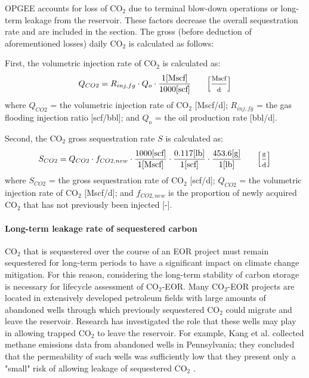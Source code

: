 \documentclass[11pt]{report}
\newcommand{\marg}[1]{{\footnotesize\textit{\textcolor{stanford}{'#1'}}}}
\newcommand{\marginnote}[1]{\marginpar{\marg{#1}}}
\begin{document}
{OPGEE accounts for loss of CO$_2$ due to terminal blow-down operations or long-term leakage from the reservoir. These factors decrease the overall sequestration rate and are included in the  section. The gross (before deduction of aforementioned losses) daily CO$_2$ is calculated as follows:

First, the volumetric injection rate of CO$_2$ is calculated as: 
\begin{equation} \label{eq:VolumetricFloodGasInjectionRate}
Q_{CO2} = R_{inj,fg} \cdot Q_{o} \cdot \frac{1 [\text{Mscf}]}{1000 [\text{scf}]} \begin{footnotesize} \quad\quad \left[\frac{\text{Mscf}}{\text{d}}\right] \end{footnotesize}
\end{equation}
where $Q_{CO2}$ = the volumetric injection rate of CO$_2$ [Mscf/d]; $R_{inj,fg}$ = the gas flooding injection ratio [scf/bbl]; and $Q_{o}$ = the oil production rate [bbl/d].

Second, the CO$_2$ gross sequestration rate $S$ is calculated as: \marginnote{Production \& Extraction 2.7.11} 
\begin{equation} \label{eq:CO2Sequestration}
S_{CO2} = Q_{CO2} \cdot f_{CO2,new} \cdot \frac{1000 [\text{scf}]}{1 [\text{Mscf}]} \cdot \frac{0.117 [\text{lb}]}{1 [\text{scf}]} \cdot \frac{453.6 [\text{g}]}{1 [\text{lb}]} \begin{footnotesize} \quad\quad \left[\frac{\text{g}}{\text{d}}\right] \end{footnotesize}
\end{equation}
where $S_{CO2}$ = the gross sequestration rate of CO$_2$ [scf/d]; $Q_{CO2}$ = the volumetric injection rate of CO$_2$ [Mscf/d]; and $f_{CO2,new}$ is the proportion of newly acquired CO$_2$ that has not previously been injected [-].


\paragraph{Long-term leakage rate of sequestered carbon} \label{par:LongTermLeakageRate}
CO$_2$ that is sequestered over the course of an EOR project must remain sequestered for long-term periods to have a significant impact on climate change mitigation. For this reason, considering the long-term stability of carbon storage is necessary for lifecycle assessment of CO$_2$-EOR.  Many CO$_2$-EOR projects are located in extensively developed petroleum fields with large amounts of abandoned wells through which previously sequestered CO$_2$ could migrate and leave the reservoir. Research has investigated the role that these wells may play in allowing trapped CO$_2$ to leave the reservoir. For example, Kang et al. collected methane emissions data from abandoned wells in Pennsylvania; they concluded that the permeability of such wells was sufficiently low that they present only a "small" risk of allowing leakage of sequestered CO$_2$ \cite{kang2015effective}.  

}
\end{document}
